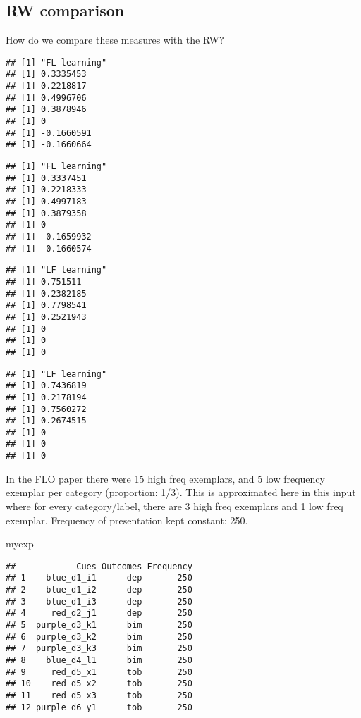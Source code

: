 \documentclass[
]{article}
\newenvironment{Shaded}{\begin{snugshade}}{\end{snugshade}}
\newcommand{\NormalTok}[1]{#1}
\begin{document}
\hypertarget{rw-comparison}{%
\subsection{RW comparison}\label{rw-comparison}}

How do we compare these measures with the RW?

\begin{verbatim}
## [1] "FL learning"
## [1] 0.3335453
## [1] 0.2218817
## [1] 0.4996706
## [1] 0.3878946
## [1] 0
## [1] -0.1660591
## [1] -0.1660664
\end{verbatim}

\begin{verbatim}
## [1] "FL learning"
## [1] 0.3337451
## [1] 0.2218333
## [1] 0.4997183
## [1] 0.3879358
## [1] 0
## [1] -0.1659932
## [1] -0.1660574
\end{verbatim}

\begin{verbatim}
## [1] "LF learning"
## [1] 0.751511
## [1] 0.2382185
## [1] 0.7798541
## [1] 0.2521943
## [1] 0
## [1] 0
## [1] 0
\end{verbatim}

\begin{verbatim}
## [1] "LF learning"
## [1] 0.7436819
## [1] 0.2178194
## [1] 0.7560272
## [1] 0.2674515
## [1] 0
## [1] 0
## [1] 0
\end{verbatim}

In the FLO paper there were 15 high freq exemplars, and 5 low frequency
exemplar per category (proportion: 1/3). This is approximated here in
this input where for every category/label, there are 3 high freq
exemplars and 1 low freq exemplar. Frequency of presentation kept
constant: 250.

\begin{Shaded}
\begin{Highlighting}[]
\NormalTok{myexp}
\end{Highlighting}
\end{Shaded}

\begin{verbatim}
##            Cues Outcomes Frequency
## 1    blue_d1_i1      dep       250
## 2    blue_d1_i2      dep       250
## 3    blue_d1_i3      dep       250
## 4     red_d2_j1      dep       250
## 5  purple_d3_k1      bim       250
## 6  purple_d3_k2      bim       250
## 7  purple_d3_k3      bim       250
## 8    blue_d4_l1      bim       250
## 9     red_d5_x1      tob       250
## 10    red_d5_x2      tob       250
## 11    red_d5_x3      tob       250
## 12 purple_d6_y1      tob       250
\end{verbatim}
\end{document}

